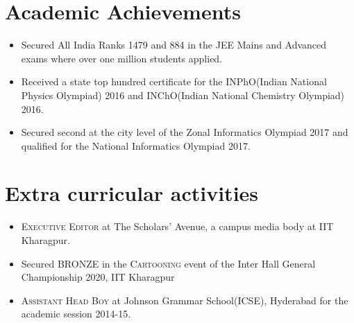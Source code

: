 \documentclass[a4paper,10pt]{article}
\begin{document}
\section{Academic Achievements}
\small
\begin{itemize}
\item Secured All India Ranks 1479 and 884 in the JEE Mains and Advanced exams where over one million students applied.
\item Received a state top hundred certificate for the INPhO(Indian National Physics Olympiad) 2016 and INChO(Indian National Chemistry Olympiad) 2016.
\item Secured second at the city level of the Zonal Informatics Olympiad 2017 and qualified for the National Informatics Olympiad 2017.
\end{itemize}


\section{Extra curricular activities}
\small
\begin{itemize}
	\item{\textsc{Executive Editor} at The Scholars' Avenue, a campus media body at IIT Kharagpur.}
	\item{Secured \textsc{BRONZE} in the \textsc{Cartooning} event of  the Inter Hall General Championship 2020, IIT Kharagpur}	
	\item{\textsc{Assistant Head Boy} at Johnson Grammar School(ICSE), Hyderabad for the academic session 2014-15}.
\end{itemize}
\end{document}
